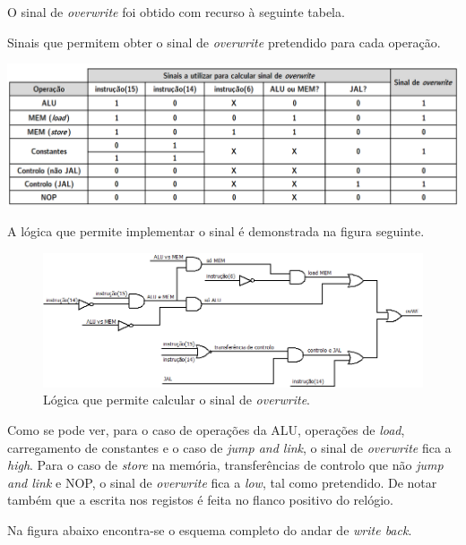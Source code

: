 \documentclass[11pt]{article}
\numberwithin{equation}{section}
\begin{document}
O sinal de \textit{overwrite} foi obtido com recurso à seguinte tabela.

\vspace{1.5mm}
\begin{table}[h]
	\centering
	\caption{Sinais que permitem obter o sinal de \textit{overwrite} pretendido para cada operação.}
	\vspace{-2mm}
 	\includegraphics[keepaspectratio=true, scale=0.40]{tabelas/tabelaWE}
\end{table}

A lógica que permite implementar o sinal é demonstrada na figura seguinte.

\begin{figure}[h]
	\centering
	\includegraphics[keepaspectratio=true, scale=0.35]{imagens/WB3}
	\caption{Lógica que permite calcular o sinal de \textit{overwrite}.}
	\vspace{-0.8em}
\end{figure}

Como se pode ver, para o caso de operações da ALU, operações de \textit{load}, carregamento de constantes e o caso de \textit{jump and link}, o sinal de \textit{overwrite} fica a \textit{high}. Para o caso de \textit{store} na memória, transferências de controlo que não \textit{jump and link} e NOP, o sinal de \textit{overwrite} fica a \textit{low}, tal como pretendido. De notar também que a escrita nos registos é feita no flanco positivo do relógio. 

Na figura abaixo encontra-se o esquema completo do andar de \textit{write back}.
\end{document}

